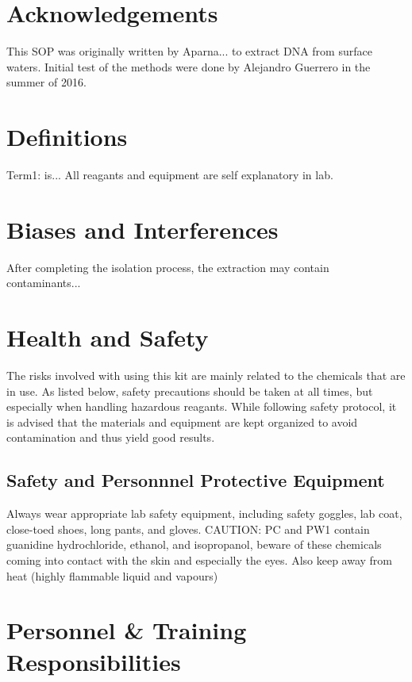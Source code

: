 \documentclass[12pt]{../SOP3_alpha}
\begin{document}
\tableofcontents

\newpage

\section{Acknowledgements}

\NP This SOP was originally written by Aparna... to extract DNA from surface waters. Initial test of the methods were done by Alejandro Guerrero in the summer of 2016. 

\section{Definitions}

\NP Term1: is... All reagants and equipment are self explanatory in lab. 

\section{Biases and Interferences}

\NP After completing the isolation process, the extraction may contain contaminants... 



\section{Health and Safety}

\NP The risks involved with using this kit are mainly related to the chemicals that are in use. As listed below, safety precautions should be taken at all times, but especially when handling hazardous reagants. While following safety protocol, it is advised that the materials and equipment are kept organized to avoid contamination and thus yield good results. 


\subsection {Safety and Personnnel Protective Equipment}

Always wear appropriate lab safety equipment, including safety goggles, lab coat, close-toed shoes, long pants, and gloves. 
CAUTION: PC and PW1 contain guanidine hydrochloride, ethanol, and isopropanol, beware of these chemicals coming into contact with the skin and especially the eyes. Also keep away from heat (highly flammable liquid and vapours)


\section{Personnel \& Training Responsibilities}
\end{document}

